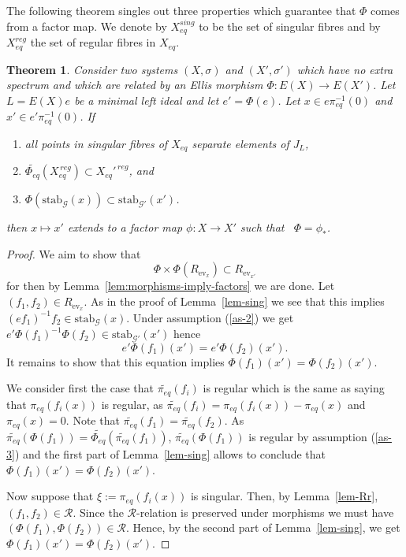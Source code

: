 \documentclass[12pt]{amsart}
\newtheorem{theorem}{Theorem}[section]
\theoremstyle{definition}
\numberwithin{equation}{section}
\newcommand{\Gg}{{\mathcal G}}
\newcommand{\Rr}{{\mathcal R}}
\newcommand{\Xe}{X_{eq}}
\newcommand{\pe}{\pi_{eq}}
\newcommand{\tpe}{\widetilde{\pe}}
\newcommand{\ev}{\mathrm{ev}}
\newcommand{\stab}{\mathrm{stab}}
\newcommand{\tPhe}{\widetilde{\Phi_{eq}}}
\begin{document}
The following theorem singles out three properties which guarantee that $\Phi$ comes from a factor map.  
We denote by $\Xe^{sing}$ to be the set of singular fibres and by $\Xe^{reg}$ the set of regular fibres in $\Xe$.
\begin{theorem}\label{thm-main} Consider two systems
$(X,\sigma)$ and $(X',\sigma')$ which have no extra spectrum and which are related by an 
Ellis morphism $\Phi:E(X)\rightarrow E(X')$. Let $L=E(X)e$ be a minimal left ideal and let $e'=\Phi(e)$. Let  $x\in e\pe^{-1}(0)$ and $x'\in e'\pe^{-1}(0)$. If
\begin{enumerate}
\item\label{as-1} all points in singular fibres of $\Xe$ separate elements of  $J_L$,
\item\label{as-3} $\tPhe ( \Xe^{\,reg}  ) \subset \Xe'^{\, reg}$, and
\item\label{as-2} $\Phi(\stab_{\Gg}(x))\subset \stab_{\Gg'}(x')$.
\end{enumerate}
then $x \mapsto x'$ extends to a factor map $\phi:X\to X'$ such that \ $\Phi=\phi_*$.  
\end{theorem}
\begin{proof}
We aim to show that  
$$\Phi\times\Phi (R_{\ev_{x}})\subset R_{\ev_{x'}}$$
for then by Lemma~\ref{lem:morphisms-imply-factors} we are done.
Let $(f_1,f_2)\in R_{\ev_{x}}$. %
As in the proof of  Lemma~\ref{lem-sing} we see that this implies $(ef_1)^{-1}f_2 \in \stab_{\Gg}(x)$. 
Under assumption (\ref{as-2}) %
we get $e'\Phi(f_1)^{-1}\Phi(f_2)\in {\stab_{\Gg'}(x')}$ %
hence
\begin{equation}\label{eq-1}
e'\Phi(f_1)(x')=e'\Phi(f_2)(x').
\end{equation}
It remains to show that this equation implies 
$\Phi(f_1)(x')=\Phi(f_2)(x')$. 


We consider first the case that $ \tpe(f_i)$ is regular which is the same as saying that  $\pe(f_i(x))$ is regular, as $ \tpe(f_i)= \pe(f_i(x))-\pe(x)$ and $\pe(x)=0$.
Note that $ \tpe(f_1)= \tpe(f_2)$. As 
$\tpe(\Phi(f_1))=\tPhe(\tpe(f_1))$, $\tpe(\Phi(f_1))$ is regular by assumption (\ref{as-3})
and the first part of Lemma~\ref{lem-sing} allows to conclude  
that $\Phi(f_1)(x')=\Phi(f_2)(x')$.

Now suppose that $\xi:= \pe(f_i(x))$ is singular. Then, 
by Lemma~\ref{lem-Rr}, $(f_1,f_2)\in \Rr$. Since the $\Rr$-relation is preserved under morphisms we must have $(\Phi(f_1),\Phi(f_2))\in\Rr$.
Hence, by the second part of Lemma~\ref{lem-sing}, we get $\Phi(f_1)(x')=\Phi(f_2)(x')$. 
\end{proof}
\end{document}
